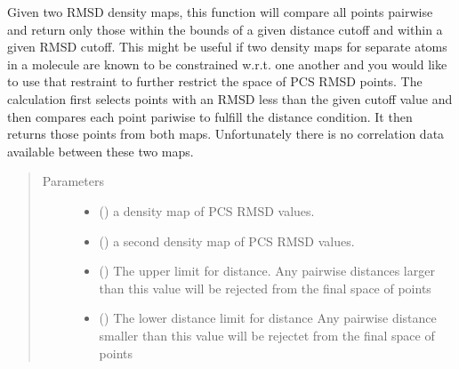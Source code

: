 \documentclass[a4paper,10pt,english,openany,oneside]{sphinxmanual}
\begin{document}
\begin{fulllineitems}
\label{\detokenize{reference/generated/paramagpy.fit.gridsearch_fit_atom_restrain_distance_cutoff:paramagpy.fit.gridsearch_fit_atom_restrain_distance_cutoff}}
\sphinxAtStartPar
Given two RMSD density maps, this function will compare
all points pairwise and return only those within the bounds of
a given distance cutoff and within a given RMSD cutoff.
This might be useful if two density maps for separate atoms
in a molecule are known to be constrained w.r.t. one another
and you would like to use that restraint to further restrict
the space of PCS RMSD points.
The calculation first selects points with an RMSD less than
the given cutoff value and then compares each point pariwise to
fulfill the distance condition. It then returns those points
from both maps. Unfortunately there is no correlation data
available between these two maps.
\begin{quote}\begin{description}
\item[{Parameters}] \leavevmode\begin{itemize}
\item {} 
\sphinxAtStartPar
{} ({\hyperref[\detokenize{reference/generated/paramagpy.fit.DensityMap:paramagpy.fit.DensityMap}]{}}) \textendash{} a density map of PCS RMSD values.

\item {} 
\sphinxAtStartPar
{} ({\hyperref[\detokenize{reference/generated/paramagpy.fit.DensityMap:paramagpy.fit.DensityMap}]{}}) \textendash{} a second density map of PCS RMSD values.

\item {} 
\sphinxAtStartPar
{} () \textendash{} The upper limit for distance.
Any pairwise distances larger than this value
will be rejected from the final space of points

\item {} 
\sphinxAtStartPar
{} () \textendash{} The lower distance limit for distance
Any pairwise distance smaller than this value
will be rejectet from the final space of points


\end{itemize}
\end{description}
\end{quote}
\end{fulllineitems}
\end{document}
